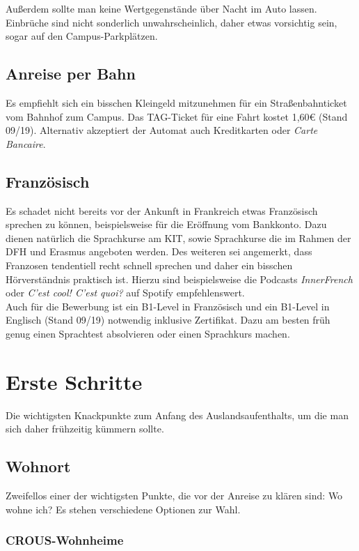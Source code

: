 \documentclass[11pt,a4paper]{article}
\begin{document}
  Außerdem sollte man keine Wertgegenstände über Nacht im Auto lassen. Einbrüche sind nicht sonderlich unwahrscheinlich, daher etwas vorsichtig sein, sogar auf den Campus-Parkplätzen.

  \subsection{Anreise per Bahn}
  Es empfiehlt sich ein bisschen Kleingeld mitzunehmen für ein Straßenbahnticket vom Bahnhof zum Campus. Das TAG-Ticket für eine Fahrt kostet 1,60€ (Stand 09/19). Alternativ akzeptiert der Automat auch Kreditkarten oder \textit{Carte Bancaire}.

  \subsection{Französisch}
  Es schadet nicht bereits vor der Ankunft in Frankreich etwas Französisch sprechen zu können, beispielsweise für die Eröffnung vom Bankkonto. Dazu dienen natürlich die Sprachkurse am KIT, sowie Sprachkurse die im Rahmen der DFH und Erasmus angeboten werden. Des weiteren sei angemerkt, dass Franzosen tendentiell recht schnell sprechen und daher ein bisschen Hörverständnis praktisch ist. Hierzu sind beispielsweise die Podcasts \textit{InnerFrench} oder \textit{C'est cool! C'est quoi?} auf Spotify empfehlenswert.\\
  Auch für die Bewerbung ist ein B1-Level in Französisch und ein B1-Level in Englisch (Stand 09/19) notwendig inklusive Zertifikat. Dazu am besten früh genug einen Sprachtest absolvieren oder einen Sprachkurs machen.
		
	\newpage
	\section{Erste Schritte}
	
	Die wichtigsten Knackpunkte zum Anfang des Auslandsaufenthalts, um die man sich daher frühzeitig kümmern sollte.
	
	\subsection{Wohnort}
	
	Zweifellos einer der wichtigsten Punkte, die vor der Anreise zu klären sind: Wo wohne ich? Es stehen verschiedene Optionen zur Wahl.
	
	\subsubsection{CROUS-Wohnheime}
	
\end{document}
